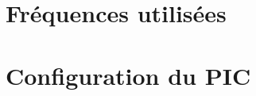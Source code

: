 \documentclass{article}
\begin{document}


    \newpage
    \section{Fréquences utilisées}

    \section{Configuration du PIC}
    \label{section:configuration}


\end{document}
